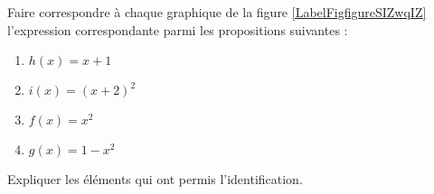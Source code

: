 
\begin{exercice}\label{exosmath-0252}

    Faire correspondre à chaque graphique de la figure \ref{LabelFigfigureSIZwqIZ} l'expression correspondante parmi les propositions suivantes :
    \begin{multicols}{2}
        \begin{enumerate}
            \item
                \( h(x)=x+1\)
            \item
                \( i(x)=(x+2)^2\)
            \item
                $f(x)=x^2$
            \item
                \( g(x)=1-x^2\)
        \end{enumerate}
    \end{multicols}

    \newcommand{\CaptionFigfigureSIZwqIZ}{Les graphes de l'exercice \ref{exosmath-0252}.}
    

    Expliquer les éléments qui ont permis l'identification.

\end{exercice}

